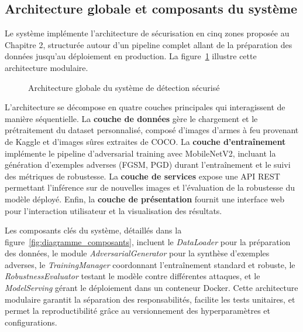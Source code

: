 \subsection{Architecture globale et composants du système}

Le système implémente l'architecture de sécurisation en cinq zones proposée au Chapitre 2, structurée autour d'un pipeline complet allant de la préparation des données jusqu'au déploiement en production. La figure~\ref{fig:architecture_globale} illustre cette architecture modulaire.

\begin{figure}[H]
    \centering
    \caption{Architecture globale du système de détection sécurisé}
    \label{fig:architecture_globale}
\end{figure}

L'architecture se décompose en quatre couches principales qui interagissent de manière séquentielle. La \textbf{couche de données} gère le chargement et le prétraitement du dataset personnalisé, composé d'images d'armes à feu provenant de Kaggle et d'images sûres extraites de COCO. La \textbf{couche d'entraînement} implémente le pipeline d'adversarial training avec MobileNetV2, incluant la génération d'exemples adverses (FGSM, PGD) durant l'entraînement et le suivi des métriques de robustesse. La \textbf{couche de services} expose une API REST permettant l'inférence sur de nouvelles images et l'évaluation de la robustesse du modèle déployé. Enfin, la \textbf{couche de présentation} fournit une interface web pour l'interaction utilisateur et la visualisation des résultats.

Les composants clés du système, détaillés dans la figure~\ref{fig:diagramme_composants}, incluent le \textit{DataLoader} pour la préparation des données, le module \textit{AdversarialGenerator} pour la synthèse d'exemples adverses, le \textit{TrainingManager} coordonnant l'entraînement standard et robuste, le \textit{RobustnessEvaluator} testant le modèle contre différentes attaques, et le \textit{ModelServing} gérant le déploiement dans un conteneur Docker. Cette architecture modulaire garantit la séparation des responsabilités, facilite les tests unitaires, et permet la reproductibilité grâce au versionnement des hyperparamètres et configurations.

